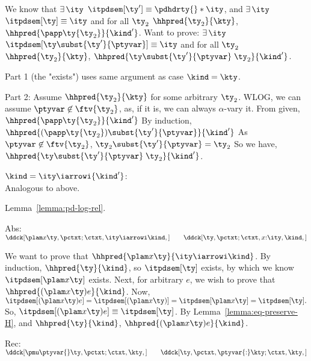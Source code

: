 \begin{list}{\textbf{Proof:}}{
      \setlength{\leftmargin}{0in}
      \setlength{\listparindent}{0in}}
\begin{caseproof}
  We know that
    $\exists\,\ity$ \suchthat{} $\itpdsem[{\ty'}] \equiv \pdhdrty{}
    * \ity$, and
    $\exists\,\ity$ \suchthat{} $\itpdsem[\ty] \equiv \ity$ and for
    all ${\ty_2}$ \suchthat{} $\hhpred{\ty_2}{ \kty}$, $\hhpred{\papp \ty {\ty_2} }{ {\kind'}}$.
  Want to prove:
    $\exists\,\ity$ \suchthat{} $\itpdsem[\ty\subst{\ty'}{\ptyvar}] \equiv \ity$ and 
      for all ${\ty_2}$ \suchthat{}$\hhpred{{\ty_2} }{ \kty}$,
      $\hhpred{\ty\subst{\ty'}{\ptyvar} \; {\ty_2} }{ {\kind'}}$.

  Part 1 (the "exists") uses same argument as case ${\kind} = \kty$.

  Part 2:
  Assume $\hhpred{{\ty_2}}{\kty}$ for some arbitrary ${\ty_2}$.
    WLOG, we can assume $\ptyvar \not \in \ftv {\ty_2}$, as, if it is, we can always
    $\alpha$-vary it. 
    From given, 
      $\hhpred{\papp \ty {\ty_2}}{ {\kind'}}$
    By induction,
      $\hhpred{(\papp \ty {\ty_2})\subst{\ty'}{\ptyvar}}{{\kind'}}$
    As $\ptyvar \not \in \ftv {\ty_2}$,
      ${\ty_2}\subst{\ty'}{\ptyvar} = {\ty_2}$
    So we have,
      $\hhpred{\ty\subst{\ty'}{\ptyvar} \; {\ty_2}}{{\kind'}}$.

\item ${\kind} = \ity \iarrowi {\kind'}$: \\
  Analogous to above.
\end{caseproof}

\item Lemma~\ref{lemma:pd-log-rel}.
\begin{caseproof}
\item Abs: \quad $\ddck[{\plam x {} \ty},{\pctxt;\ctxt},\ity \iarrowi \kind,{}] 
  \qquad \ddck[\ty,{\pctxt;\ctxt,x{:}\ity},\kind,{}]$

  We want to prove that $\hhpred{\plam x {} \ty}{\ity \iarrowi \kind}$.
  By induction, $\hhpred{\ty}{{\kind}}$, so $\itpdsem[\ty]$ exists, by which we know 
  $\itpdsem[\plam x {} \ty]$ exists.
  Next, for arbitrary $e$, we wish to prove that
      $\hhpred{(\plam x {} \ty) e}{\kind}$. 
    Now, 
      $\itpdsem[(\plam x {} \ty) e] = \itpdsem[(\plam x {} \ty)] =\itpdsem[\plam x {} \ty] = \itpdsem[\ty].$
    So, 
      $\itpdsem[(\plam x {} \ty) e] \equiv \itpdsem[\ty]$.
    By Lemma~\ref{lemma:eq-preserve-H}, and $\hhpred{\ty}{{\kind}}$, 
      $\hhpred{(\plam x {} \ty) e}{{\kind}}$.

\item Rec:\quad $\ddck[{\pmu \ptyvar {} \ty},{\pctxt;\ctxt},\kty,{}] 
  \qquad \ddck[\ty,{\pctxt,\ptyvar{:}\kty;\ctxt},\kty,{}]$


\end{caseproof}
\end{list}
